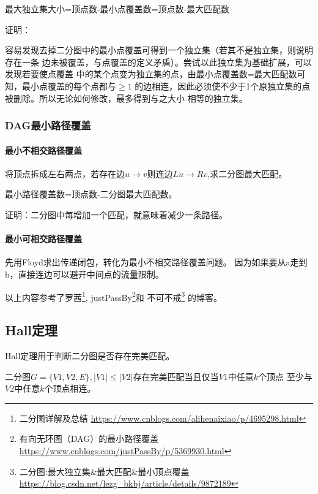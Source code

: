 \begin{theorem}
	最大独立集大小=顶点数-最小点覆盖数=顶点数-最大匹配数
\end{theorem}

证明：

容易发现去掉二分图中的最小点覆盖可得到一个独立集（若其不是独立集，则说明存在一条
边未被覆盖，与点覆盖的定义矛盾）。尝试以此独立集为基础扩展，可以发现若要使点覆盖
中的某个点变为独立集的点，由最小点覆盖数=最大匹配数可知，最小点覆盖的每个点都与$\geq 1$
的边相连，因此必须使不少于1个原独立集的点被删除。所以无论如何修改，最多得到与之大小
相等的独立集。

\subsubsection{DAG最小路径覆盖}

\paragraph{最小不相交路径覆盖}

将顶点拆成左右两点，若存在边$u\rightarrow v$则连边$Lu\rightarrow Rv$,求二分图最大匹配。

\begin{theorem}
	最小路径覆盖数=顶点数-二分图最大匹配数。
\end{theorem}

证明：二分图中每增加一个匹配，就意味着减少一条路径。

\paragraph{最小可相交路径覆盖}

先用Floyd求出传递闭包，转化为最小不相交路径覆盖问题。
因为如果要从a走到b，直接连边可以避开中间点的流量限制。

以上内容参考了罗茜\footnote{二分图详解及总结
	\url{https://www.cnblogs.com/alihenaixiao/p/4695298.html}},
justPassBy\footnote{有向无环图（DAG）的最小路径覆盖
	\url{https://www.cnblogs.com/justPassBy/p/5369930.html}}和
不可不戒\footnote{二分图:最大独立集\&最大匹配\&最小顶点覆盖
	\url{https://blog.csdn.net/lezg\_bkbj/article/details/9872189}}
的博客。
\subsection{Hall定理}
Hall定理用于判断二分图是否存在完美匹配。
\begin{theorem}\label{Hall}
    二分图$G=\{V1,V2,E\},|V1|\leq|V2|$存在完美匹配当且仅当$V1$中任意$k$个顶点
    至少与$V2$中任意$k$个顶点相连。
\end{theorem}
